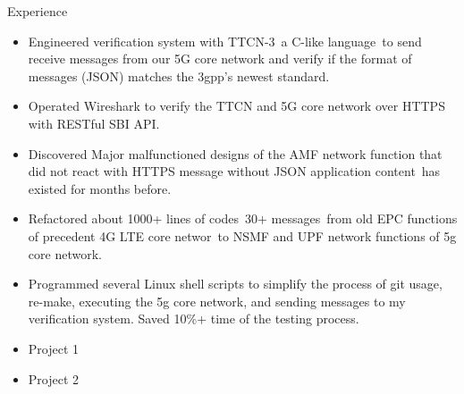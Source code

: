 \documentclass{resume} %
\begin{document}
\begin{workSection}{Experience}
     
    \experienceItem[
        company=Free5gc Team of NCTU,
        location=Hsinchu{,} Taiwan,
        position=Backend Engineer (Research Assistant),
        duration=Jul 2019 – Nov 2019
    ]
    \begin{itemize}
        \itemsep -6pt {} 
        \item Engineered verification system with TTCN-3\, a C-like language\, to send\, receive messages from our 5G core network and verify if the format of messages (JSON) matches the 3gpp’s newest standard.
        \item Operated Wireshark to verify the TTCN and 5G core network over HTTPS with RESTful SBI API.
        \item Discovered Major malfunctioned designs of the AMF network function that did not react with HTTPS message without JSON application content\, has existed for months before.
        \item Refactored about 1000+ lines of codes\, 30+ messages\, from old EPC functions of precedent 4G LTE core networ\, to NSMF and UPF network functions of 5g core network.
        \item Programmed several Linux shell scripts to simplify the process of git usage, re-make, executing the 5g core network, and sending messages to my verification system. Saved 10\%+ time of the testing process.
     \end{itemize}

     
    \experienceItem[
        company=Bluh,
        location=BluhCity{,} BluhState,
        position=Embedded Systems engineer (Research Assistant),
        duration=May 2018 – Aug 2018
    ]
    \begin{itemize}
        \itemsep -6pt {} 
        \item Project 1
        \item Project 2
     \end{itemize}
     
\end{workSection}
\end{document}

